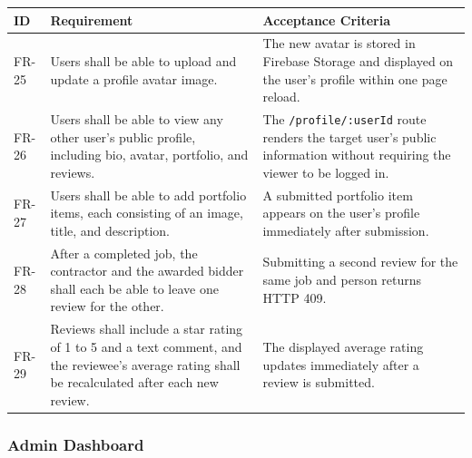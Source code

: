 \documentclass[11pt]{article}
\begin{document}
\begin{longtable}{@{}p{1.8cm}p{5.8cm}p{5.8cm}@{}}
\toprule
\textbf{ID} & \textbf{Requirement} & \textbf{Acceptance Criteria} \\
\midrule
\endhead
FR-25 & Users shall be able to upload and update a profile avatar image. & The new avatar is stored in Firebase Storage and displayed on the user's profile within one page reload. \\
\midrule
FR-26 & Users shall be able to view any other user's public profile, including bio, avatar, portfolio, and reviews. & The \texttt{/profile/:userId} route renders the target user's public information without requiring the viewer to be logged in. \\
\midrule
FR-27 & Users shall be able to add portfolio items, each consisting of an image, title, and description. & A submitted portfolio item appears on the user's profile immediately after submission. \\
\midrule
FR-28 & After a completed job, the contractor and the awarded bidder shall each be able to leave one review for the other. & Submitting a second review for the same job and person returns HTTP 409. \\
\midrule
FR-29 & Reviews shall include a star rating of 1 to 5 and a text comment, and the reviewee's average rating shall be recalculated after each new review. & The displayed average rating updates immediately after a review is submitted. \\
\bottomrule
\end{longtable}

\subsubsection{Admin Dashboard}
\end{document}
